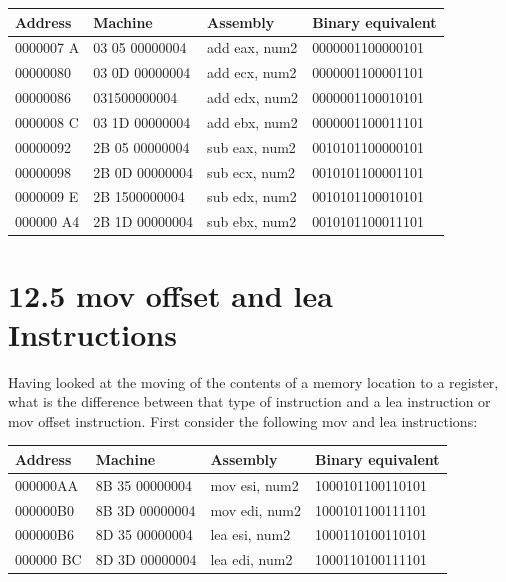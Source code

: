 \documentclass[10pt]{article}
\begin{document}
\begin{center}
\begin{tabular}{|l|l|l|l|}
\hline
Address & Machine & Assembly & Binary equivalent \\
\hline
0000007 A & 03 05 00000004 & add eax, num2 & 0000001100000101 \\
\hline
00000080 & 03 0D 00000004 & add ecx, num2 & 0000001100001101 \\
\hline
00000086 & 031500000004 & add edx, num2 & 0000001100010101 \\
\hline
0000008 C & 03 1D 00000004 & add ebx, num2 & 0000001100011101 \\
\hline
00000092 & 2B 05 00000004 & sub eax, num2 & 0010101100000101 \\
\hline
00000098 & 2B 0D 00000004 & sub ecx, num2 & 0010101100001101 \\
\hline
0000009 E & 2B 1500000004 & sub edx, num2 & 0010101100010101 \\
\hline
000000 A4 & 2B 1D 00000004 & sub ebx, num2 & 0010101100011101 \\
\hline
\end{tabular}
\end{center}

\section*{12.5 mov offset and lea Instructions}
Having looked at the moving of the contents of a memory location to a register, what is the difference between that type of instruction and a lea instruction or mov offset instruction. First consider the following mov and lea instructions:

\begin{center}
\begin{tabular}{|l|l|l|l|}
\hline
Address & Machine & Assembly & Binary equivalent \\
\hline
000000AA & 8B 35 00000004 & mov esi, num2 & 1000101100110101 \\
\hline
000000B0 & 8B 3D 00000004 & mov edi, num2 & 1000101100111101 \\
\hline
000000B6 & 8D 35 00000004 & lea esi, num2 & 1000110100110101 \\
\hline
000000 BC & 8D 3D 00000004 & lea edi, num2 & 1000110100111101 \\
\hline
\end{tabular}
\end{center}
\end{document}
